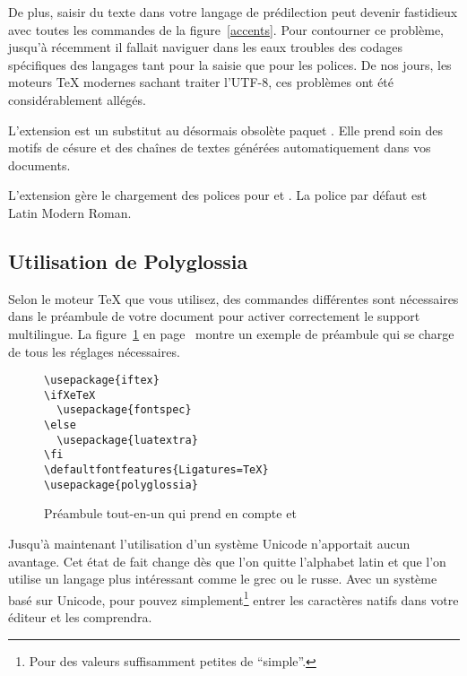 De plus, saisir du texte dans votre langage de prédilection peut
devenir fastidieux avec toutes les commandes de la
figure~\ref{accents}. Pour contourner ce problème, jusqu'à récemment
il fallait naviguer dans les eaux troubles des codages spécifiques des
langages tant pour la saisie que pour les polices. De nos jours, les
moteurs \TeX{} modernes sachant traiter l'UTF-8, ces problèmes ont été
considérablement allégés.

L'extension \cite{polyglossia} est un substitut au désormais obsolète paquet
. Elle prend soin des motifs de césure et des chaînes de
textes générées automatiquement dans vos documents.

L'extension \cite{fontspec} gère le chargement des
polices pour  et . La police par défaut
est Latin Modern Roman.

\subsection{Utilisation de Polyglossia}

Selon le moteur \TeX{} que vous utilisez, des commandes différentes
sont nécessaires dans le préambule de votre document pour activer
correctement le support multilingue.
La figure~\ref{allinone} en page~\pageref{allinone} montre un exemple
de préambule qui se charge de tous les réglages nécessaires.

\begin{figure}[!bp]
\begin{lined}{10cm}
\begin{verbatim}
\usepackage{iftex}
\ifXeTeX
  \usepackage{fontspec}
\else
  \usepackage{luatextra}
\fi
\defaultfontfeatures{Ligatures=TeX}
\usepackage{polyglossia}
\end{verbatim}
\end{lined}
\caption[Préambule tout-en-un]{Préambule tout-en-un qui prend en compte  et } \label{allinone}
\end{figure}


Jusqu'à maintenant l'utilisation d'un système  Unicode
n'apportait aucun avantage. Cet état de fait change dès que l'on
quitte l'alphabet latin et que l'on utilise un langage plus
intéressant comme le grec ou le russe. Avec un système basé sur
Unicode, pour pouvez simplement\footnote{Pour des valeurs suffisamment
  petites de \enquote{simple}.} entrer les caractères natifs dans votre éditeur
et  les comprendra.

